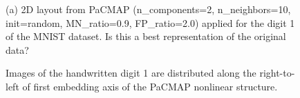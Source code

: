 \documentclass[
  12pt]{article}
\begin{document}
\begin{figure}[H]


\caption{\label{fig-pacmapauthor}(a) 2D layout from PaCMAP
(n\_components=2, n\_neighbors=10, init=random, MN\_ratio=0.9,
FP\_ratio=2.0) applied for the digit 1 of the MNIST dataset. Is this a
best representation of the original data?}

\end{figure}%

\begin{figure}[H]


\caption{\label{fig-sampleimg}Images of the handwritten digit 1 are
distributed along the right-to-left of first embedding axis of the
PaCMAP nonlinear structure.}

\end{figure}%
\end{document}
